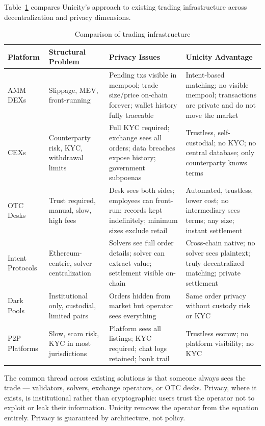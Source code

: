 \documentclass{article}
\begin{document}
Table~\ref{tab:defi-comparison} compares Unicity's approach to existing trading infrastructure across decentralization and privacy dimensions.

\begin{table}[h]
    \centering
    \caption{Comparison of trading infrastructure}
    \label{tab:defi-comparison}
    \small
    \begin{tabular}{p{2cm}p{3.5cm}p{4.5cm}p{4.5cm}}
        \toprule
        \textbf{Platform} & \textbf{Structural Problem} & \textbf{Privacy Issues} & \textbf{Unicity Advantage} \\
        \midrule
        AMM DEXs  & Slippage, MEV, front-running & Pending txs visible in mempool; trade size/price on-chain forever; wallet history fully traceable & Intent-based matching; no visible mempool; transactions are private and do not move the market \\
        \addlinespace
        CEXs  & Counterparty risk, KYC, withdrawal limits & Full KYC required; exchange sees all orders; data breaches expose history; government subpoenas & Trustless, self-custodial; no KYC; no central database; only counterparty knows terms \\
        \addlinespace
        OTC Desks & Trust required, manual, slow, high fees & Desk sees both sides; employees can front-run; records kept indefinitely; minimum sizes exclude retail & Automated, trustless, lower cost; no intermediary sees terms; any size; instant settlement \\
        \addlinespace
        Intent Protocols  & Ethereum-centric, solver centralization & Solvers see full order details; solver can extract value; settlement visible on-chain & Cross-chain native; no solver sees plaintext; truly decentralized matching; private settlement \\
        \addlinespace
        Dark Pools  & Institutional only, custodial, limited pairs & Orders hidden from market but operator sees everything & Same order privacy without custody risk or  KYC \\
        \addlinespace
        P2P Platforms  & Slow, scam risk, KYC in most jurisdictions & Platform sees all listings; KYC required; chat logs retained; bank trail & Trustless escrow; no platform visibility; no KYC \\
        \bottomrule
    \end{tabular}
\end{table}

The common thread across existing solutions is that someone always sees the trade --- validators, solvers, exchange operators, or OTC desks. Privacy, where it exists, is institutional rather than cryptographic: users trust the operator not to exploit or leak their information. Unicity removes the operator from the equation entirely. Privacy is guaranteed by architecture, not policy.
\end{document}
